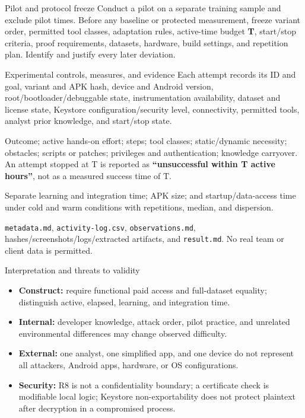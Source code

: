 \documentclass[final]{beamer}
\newlength{\colwidth}
\begin{document}
\begin{frame}[t]
\begin{columns}[t]
\begin{column}{\colwidth}
\begin{alertblock}{Pilot and protocol freeze}
  Conduct a pilot on a separate training sample and exclude pilot times. Before
  any baseline or protected measurement, freeze variant order, permitted tool
  classes, adaptation rules, active-time budget \textbf{T}, start/stop criteria,
  proof requirements, datasets, hardware, build settings, and repetition plan.
  Identify and justify every later deviation.
\end{alertblock}

\begin{block}{Experimental controls, measures, and evidence}
  Each attempt records its ID and goal, variant and APK hash, device and Android
  version, root/bootloader/debuggable state, instrumentation availability,
  dataset and license state, Keystore configuration/security level,
  connectivity, permitted tools, analyst prior knowledge, and start/stop state.

  Outcome; active hands-on effort; steps; tool classes; static/dynamic necessity;
  obstacles; scripts or patches; privileges and authentication; knowledge
  carryover. An attempt stopped at T is reported as \textbf{``unsuccessful within
  T active hours''}, not as a measured success time of T.

  Separate learning and integration time; APK size; and startup/data-access time
  under cold and warm conditions with repetitions, median, and dispersion.

  \texttt{metadata.md}, \texttt{activity-log.csv}, \texttt{observations.md},
  hashes/screenshots/logs/extracted artifacts, and \texttt{result.md}. No real
  team or client data is permitted.
\end{block}

\begin{block}{Interpretation and threats to validity}
  \begin{itemize}
    \item \textbf{Construct:} require functional paid access and full-dataset equality;
      distinguish active, elapsed, learning, and integration time.
    \item \textbf{Internal:} developer knowledge, attack order, pilot practice, and
      unrelated environmental differences may change observed difficulty.
    \item \textbf{External:} one analyst, one simplified app, and one device do not
      represent all attackers, Android apps, hardware, or OS configurations.
    \item \textbf{Security:} R8 is not a confidentiality boundary; a certificate
      check is modifiable local logic; Keystore non-exportability does not protect
      plaintext after decryption in a compromised process.
  \end{itemize}


\end{block}
\end{column}
\end{columns}
\end{frame}
\end{document}
